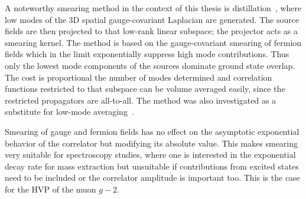 
A noteworthy smearing method in the context of this thesis is distillation~\cite{HadronSpectrum:2009krc,Knechtli:2022bji}, where low modes of the 3D spatial gauge-covariant Laplacian are generated.
The source fields are then projected to that low-rank linear subspace; the projector acts as a smearing kernel.
The method is based on the gauge-covariant smearing of fermion fields which in the limit exponentially suppress high mode contributions.
Thus only the lowest mode components of the sources dominate ground state overlap.
The cost is proportional the number of modes determined and correlation functions restricted to that subspace can be volume averaged easily, since the restricted propagators are all-to-all.
The method was also investigated as a substitute for low-mode averaging~\cite{Bushnaq:2023}.

Smearing of gauge and fermion fields has no effect on the asymptotic exponential behavior of the correlator but modifying its absolute value.
This makes smearing very suitable for spectroscopy studies, where one is interested in the exponential decay rate for mass extraction but unsuitable if contributions from excited states need to be included or the correlator amplitude is important too.
This is the case for the HVP of the muon $g-2$.

